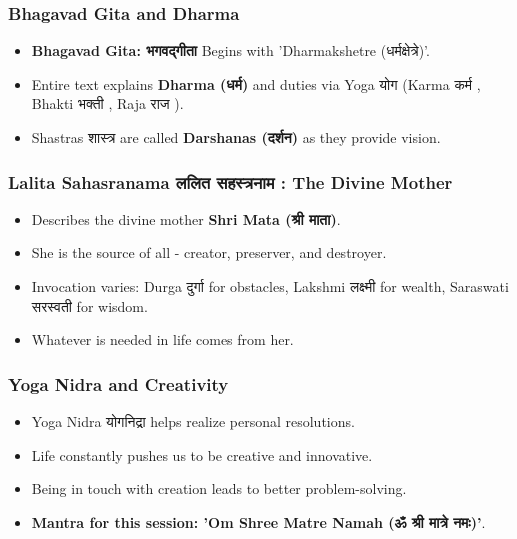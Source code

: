\begin{frame}[fragile]\frametitle{Bhagavad Gita and Dharma}
      \begin{itemize}
        \item \textbf{Bhagavad Gita: भगवद्गीता } Begins with 'Dharmakshetre (धर्मक्षेत्रे)'.
        \item Entire text explains \textbf{Dharma (धर्म)} and duties via Yoga योग  (Karma कर्म , Bhakti भक्ती , Raja राज ).
        \item Shastras शास्त्र are called \textbf{Darshanas (दर्शन)} as they provide vision.
      \end{itemize}
\end{frame}

\begin{frame}[fragile]\frametitle{Lalita Sahasranama ललित सहस्त्रनाम : The Divine Mother}
      \begin{itemize}
        \item Describes the divine mother \textbf{Shri Mata (श्री माता)}.
        \item She is the source of all - creator, preserver, and destroyer.
        \item Invocation varies: Durga दुर्गा for obstacles, Lakshmi लक्ष्मी for wealth, Saraswati सरस्वती for wisdom.
        \item Whatever is needed in life comes from her.
      \end{itemize}
\end{frame}

\begin{frame}[fragile]\frametitle{Yoga Nidra and Creativity}
      \begin{itemize}
        \item Yoga Nidra योगनिद्रा helps realize personal resolutions.
        \item Life constantly pushes us to be creative and innovative.
        \item Being in touch with creation leads to better problem-solving.
        \item \textbf{Mantra for this session: 'Om Shree Matre Namah (ॐ श्री मात्रे नमः)'}.
      \end{itemize}
\end{frame}

